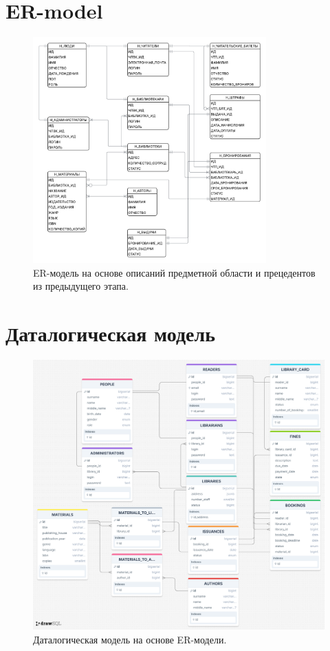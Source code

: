 \documentclass[12pt]{report}
\begin{document}
	\section*{ER-model}
	
	\begin{figure}[h]
		\centering
		\includegraphics[width=0.8\textwidth]{ER-model.png}
		\caption{ER-модель на основе описаний предметной области и прецедентов из предыдущего этапа.}
		\label{fig:ER-model}
	\end{figure}
	\newpage
	
	\section*{Даталогическая модель}
	
	\begin{figure}[h]
		\centering
		\includegraphics[width=1\textwidth]{Logical-Data-Model.png}
		\caption{Даталогическая модель на основе ER-модели.}
		\label{fig:Logical data model}
	\end{figure}
	\newpage
	
\end{document}

